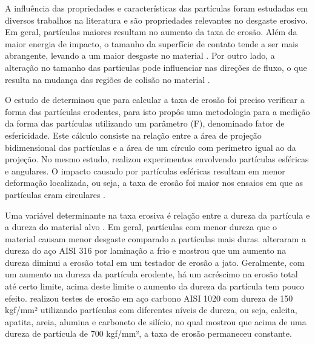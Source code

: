 
A influência das propriedades e características das partículas foram estudadas em diversos trabalhos na literatura e são propriedades relevantes no desgaste erosivo. Em geral, partículas maiores resultam no aumento da taxa de erosão. Além da maior energia de impacto, o tamanho da superfície de contato tende a ser mais abrangente, levando a um maior desgaste no material \cite{zum} \cite{lieb}. Por outro lado, a alteração no tamanho das partículas pode influenciar nas direções de fluxo, o que resulta na mudança das regiões de colisão no material \cite {clark}. 

O estudo de  determinou que para calcular a taxa de erosão foi preciso verificar a forma das partículas erodentes, para isto propôs uma metodologia para a medição da forma das partículas utilizando um parâmetro (F), denominado fator de esfericidade. Este cálculo consiste na relação entre a área de projeção bidimensional das partículas e a área de um círculo com perímetro igual ao da projeção. No mesmo estudo, realizou experimentos envolvendo partículas esféricas e angulares. O impacto causado por partículas esféricas resultam em menor deformação localizada, ou seja, a taxa de erosão foi maior nos ensaios em que as partículas eram circulares \cite{walker}. 

Uma variável determinante na taxa erosiva é relação entre a dureza da partícula e a dureza do material alvo \cite{hutchings}. Em geral, partículas com menor dureza que o material causam menor desgaste comparado a partículas mais duras.  alteraram a dureza do aço AISI 316 por laminação a frio e mostrou que um aumento na dureza diminui a erosão total em um testador de erosão a jato. Geralmente, com um aumento na dureza da partícula erodente, há um acréscimo na erosão total até certo limite, acima deste limite o aumento da dureza da partícula tem pouco efeito.  realizou testes de erosão em aço carbono AISI 1020 com dureza de 150 kgf/mm² utilizando partículas com diferentes níveis de dureza, ou seja, calcita, apatita, areia, alumina e carboneto de silício, no qual mostrou que acima de uma dureza de partícula de 700 kgf/mm², a taxa de erosão permaneceu constante. 

